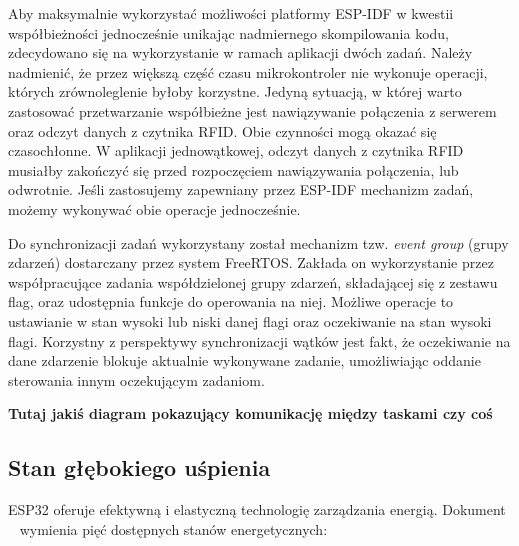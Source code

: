             Aby maksymalnie wykorzystać możliwości platformy ESP-IDF w kwestii współbieżności jednocześnie unikając nadmiernego skompilowania kodu, zdecydowano się na wykorzystanie w ramach aplikacji dwóch zadań. Należy nadmienić, że przez większą część czasu mikrokontroler nie wykonuje operacji, których zrównoleglenie byłoby korzystne. Jedyną sytuacją, w której warto zastosować przetwarzanie współbieżne jest nawiązywanie połączenia z serwerem oraz odczyt danych z czytnika RFID. Obie czynności mogą okazać się czasochłonne. W aplikacji jednowątkowej, odczyt danych z czytnika RFID musiałby zakończyć się przed rozpoczęciem nawiązywania połączenia, lub odwrotnie. Jeśli zastosujemy zapewniany przez ESP-IDF mechanizm zadań, możemy wykonywać obie operacje jednocześnie.

            Do synchronizacji zadań wykorzystany został mechanizm tzw. \textit{event group} (grupy zdarzeń) dostarczany przez system FreeRTOS. Zakłada on wykorzystanie przez współpracujące zadania współdzielonej grupy zdarzeń, składającej się z zestawu flag, oraz udostępnia funkcje do operowania na niej. Możliwe operacje to ustawianie w stan wysoki lub niski danej flagi oraz oczekiwanie na stan wysoki flagi. Korzystny z perspektywy synchronizacji wątków jest fakt, że oczekiwanie na dane zdarzenie blokuje aktualnie wykonywane zadanie, umożliwiając oddanie sterowania innym oczekującym zadaniom.

            \textbf{Tutaj jakiś diagram pokazujący komunikację między taskami czy coś}

        \subsection{Stan głębokiego uśpienia}

            ESP32 oferuje efektywną i elastyczną technologię zarządzania energią. Dokument ~\cite{esp32-ds} wymienia pięć dostępnych stanów energetycznych:

